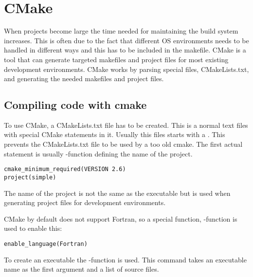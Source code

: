 \section{CMake}

When projects become large the time needed for maintaining the build system increases. This is often due to the fact that different OS environments needs to be handled in different ways and this has to be included in the makefile. CMake is a tool that can generate targeted makefiles and project files for most existing development environments. CMake works by parsing special files, CMakeLists.txt, and generating the needed makefiles and project files.

\subsection{Compiling code with cmake}

To use CMake, a CMakeLists.txt file has to be created. This is a normal text files with special CMake statements in it. Usually this files starts with a . This prevents the CMakeLists.txt file to be used by a too old cmake. The first actual statement is usually -function defining the name of the project. 

\cmmode

\begin{lstlisting}
cmake_minimum_required(VERSION 2.6)
project(simple)
\end{lstlisting}

The name of the project is not the same as the executable but is used when generating project files for development environments. 

CMake by default does not support Fortran, so a special function, -function is used to enable this:

\begin{lstlisting}
enable_language(Fortran)
\end{lstlisting}

To create an executable the -function is used. This command takes an executable name as the first argument and a list of source files. 

